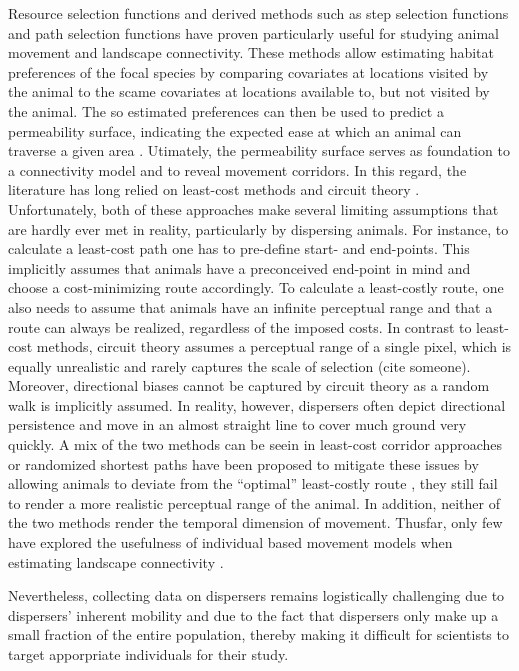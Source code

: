 \documentclass[abstract=on,10pt,a4paper,bibliography=totocnumbered]{article}
\begin{document}
Resource selection functions \citep{Boyce.2002} and derived methods such as step
selection functions \citep{Fortin.2005} and path selection functions
\citep{Cushman.2010} have proven particularly useful for studying animal
movement and landscape connectivity. These methods allow estimating habitat
preferences of the focal species by comparing covariates at locations visited by
the animal to the scame covariates at locations available to, but not visited by
the animal. The so estimated preferences can then be used to predict a
permeability surface, indicating the expected ease at which an animal can
traverse a given area \citep{Zeller.2012}. Utimately, the permeability surface
serves as foundation to a connectivity model and to reveal movement corridors.
In this regard, the literature has long relied on least-cost methods
\citep{Adriaensen.2003} and circuit theory \citep{McRae.2006, McRae.2008}.
Unfortunately, both of these approaches make several limiting assumptions that
are hardly ever met in reality, particularly by dispersing animals. For
instance, to calculate a least-cost path one has to pre-define start- and
end-points. This implicitly assumes that animals have a preconceived end-point
in mind and choose a cost-minimizing route accordingly. To calculate a
least-costly route, one also needs to assume that animals have an infinite
perceptual range and that a route can always be realized, regardless of the
imposed costs. In contrast to least-cost methods, circuit theory assumes a
perceptual range of a single pixel, which is equally unrealistic and rarely
captures the scale of selection (cite someone). Moreover, directional biases
cannot be captured by circuit theory as a random walk is implicitly assumed. In
reality, however, dispersers often depict directional persistence and move in an
almost straight line to cover much ground very quickly. A mix of the two methods
can be seein in least-cost corridor approaches or randomized shortest paths have
been proposed to mitigate these issues by allowing animals to deviate from the
``optimal'' least-costly route \citep{Pinto.2009, Panzacchi.2016,
VanMoorter.2021}, they still fail to render a more realistic perceptual range of
the animal. In addition, neither of the two methods render the temporal
dimension of movement. Thusfar, only few have explored the usefulness of
individual based movement models when estimating landscape connectivity
\citep{Kanangaraj.2013, Hauenstein.2019, Zeller.2020}.

Nevertheless, collecting data on dispersers remains logistically challenging due
to dispersers' inherent mobility and due to the fact that dispersers only make
up a small fraction of the entire population, thereby making it difficult for
scientists to target apporpriate individuals for their study.
\end{document}
